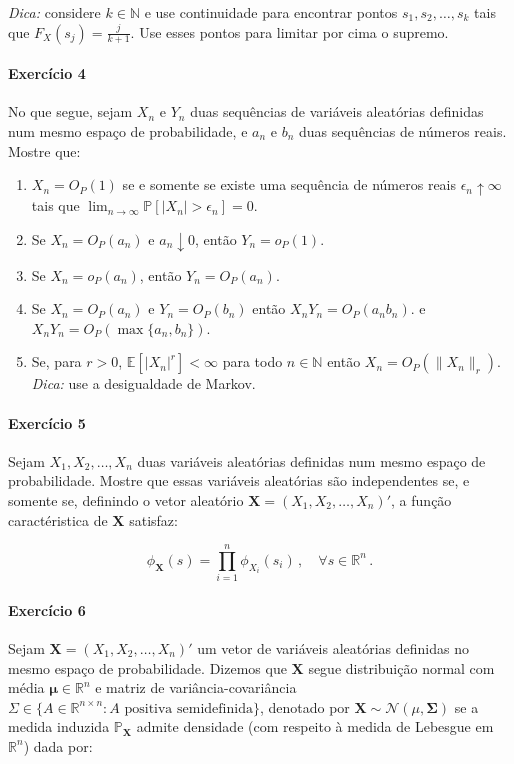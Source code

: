 \documentclass[10pt,a4paper]{article}
\begin{document}
 \noindent \textit{Dica:} considere $k \in \mathbb{N}$ e use continuidade para encontrar pontos $s_1,s_2,\ldots,s_{k}$ tais que $F_{X}(s_j) =\frac{j}{k+1}$. Use esses pontos para limitar por cima o supremo.
 
  \paragraph{Exercício 4} No que segue, sejam $X_n$ e $Y_n$ duas sequências de variáveis aleatórias definidas num mesmo espaço de probabilidade, e $a_n$ e $b_n$ duas sequências de números reais. Mostre que:
  \begin{enumerate}
  	\item $X_n = O_P(1)$ se e somente se existe uma sequência de números reais $\epsilon_n \uparrow \infty$ tais que $\lim_{n \to \infty} \mathbb{P}[|X_n|>\epsilon_n ] = 0$.
  	\item Se $X_n = O_P(a_n)$ e $a_n \downarrow 0$, então $Y_n = o_P(1)$.
  	  	\item Se $X_n = o_P(a_n)$, então $Y_n = O_P(a_n)$.
  	  	  	  	\item Se $X_n = O_P(a_n)$ e $Y_n = O_P(b_n)$  então $X_n Y_n = O_P(a_n b_n)$. e $X_n Y_n = O_P(\max\{a_n,b_n\})$.
  	  	  	  	\item Se, para $r>0$, $\mathbb{E}[|X_n|^r] < \infty$ para todo $n \in \mathbb{N}$ então $X_n  = O_P(\lVert X_n \rVert_r)$. \textit{Dica:} use a desigualdade de Markov.
  \end{enumerate} 

\paragraph{Exercício 5} Sejam $X_1, X_2, \ldots, X_n$ duas variáveis aleatórias definidas num mesmo espaço de probabilidade. Mostre que essas variáveis aleatórias são independentes se, e somente se, definindo o vetor aleatório $\boldsymbol{X}=(X_1,X_2,\ldots,X_n)'$, a função caractéristica de $\boldsymbol{X}$ satisfaz:

$$\phi_{\boldsymbol{X}}(s)= \prod_{i=1}^n \phi_{X_i}(s_i)\,, \quad \forall s \in \mathbb{R}^n\, .$$

\paragraph{Exercício 6} Sejam $\boldsymbol{X} = (X_1,X_2,\ldots,X_n)'$ um vetor de variáveis aleatórias definidas no mesmo espaço de probabilidade. Dizemos que $\boldsymbol{X}$ segue distribuição normal com média $\boldsymbol{\mu} \in \mathbb{R}^{n}$ e matriz de variância-covariância $\Sigma \in \{A \in \mathbb{R}^{n \times n}: A \text{ positiva semidefinida}\}$, denotado por $\boldsymbol{X}\sim \mathcal{N}(\mathbb{\mu},\boldsymbol{\Sigma})$ se a medida induzida $\mathbb{P}_{\boldsymbol{X}}$ admite densidade (com respeito à medida de Lebesgue em $\mathbb{R}^n$) dada por:
\end{document}
